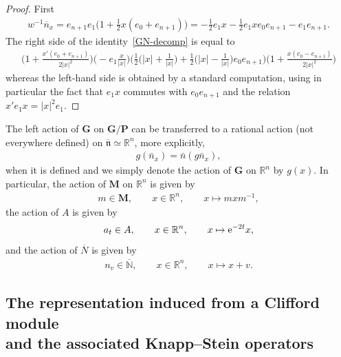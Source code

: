 \documentclass[10pt,a4paper]{amsart}
\numberwithin{equation}{section}
\begin{document}
\begin{proof}
First
\begin{gather*}
w^{-1} \overline n_x= e_{n+1}e_1\bigg(1+\frac{1}{2}x(e_0+e_{n+1})\bigg)
 =-\frac{1}{2}e_1x-\frac{1}{2}e_1xe_0e_{n+1}-e_1e_{n+1} .
\end{gather*}
The right side of the identity~\eqref{GN-decomp} is equal to
\begin{gather*}
 \bigg(\!1+\frac{x'(e_0+e_{n+1})}{2\vert x \vert^2}\bigg)
 \bigg(\!{-}e_1\frac{x}{\vert x\vert}\bigg)\bigg(\frac{1}{2}\bigg(\!\vert x\vert +\frac{1}{\vert x\vert}\bigg) + \frac{1}{2}\bigg(\!\vert x\vert -\frac{1}{\vert x\vert}\bigg)e_0e_{n+1}\bigg)
 \bigg(\!1+\frac{x(e_0-e_{n+1})}{2\vert x \vert^2} \bigg)
\end{gather*}
whereas the left-hand side is obtained by a standard computation, using in particular the fact that $e_1x$ commutes with $e_0 e_{n+1}$ and the relation $x'e_1x = \vert x\vert^2 e_1$.
\end{proof}

 The left action of $\mathbf G$ on $\mathbf G/\mathbf P$ can be transferred to a rational action (not everywhere defined) on $\overline {\mathfrak n} \simeq \mathbb R^n$,
more explicitly,
\begin{gather*}
g(\bar n_x)= \bar n( g\bar n_x),
\end{gather*}
when it is defined and we simply denote the action of $\mathbf G$ on $\mathbb R^n$ by $g(x)$.
 In particular, the action of $\mathbf M$ on $\mathbb R^n$ is given by
\begin{gather*}
m\in \mathbf M,\qquad x\in \mathbb R^n, \qquad x\mapsto mxm^{-1},
\end{gather*}
the action of $A$ is given by
\begin{gather*}
a_t\in A,\qquad x\in \mathbb R^n,\qquad x\mapsto {{\rm e}^{-2t} x},
\end{gather*}
and the action of $\overline N$ is given by
\begin{gather*}
n_v\in \mathbb \overline N,\qquad x\in \mathbb R^n,\qquad x\mapsto x+v.
\end{gather*}

\subsection[The representation induced from a Clifford module and the associated Knapp--Stein operators]
{The representation induced from a Clifford module \\and the associated Knapp--Stein operators}\label{S33}
\end{document}
